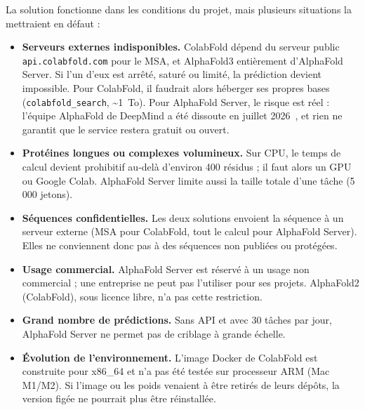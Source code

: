 La solution fonctionne dans les conditions du projet, mais plusieurs situations la mettraient en défaut :
\begin{itemize}
  \item \textbf{Serveurs externes indisponibles.} ColabFold dépend du serveur public \texttt{api.colabfold.com} pour le MSA, et AlphaFold3 entièrement d'AlphaFold Server. Si l'un d'eux est arrêté, saturé ou limité, la prédiction devient impossible. Pour ColabFold, il faudrait alors héberger ses propres bases (\texttt{colabfold\_search}, \textasciitilde 1~To). Pour AlphaFold Server, le risque est réel : l'équipe AlphaFold de DeepMind a été dissoute en juillet 2026~\cite{gigazine2026}, et rien ne garantit que le service restera gratuit ou ouvert.
  \item \textbf{Protéines longues ou complexes volumineux.} Sur CPU, le temps de calcul devient prohibitif au-delà d'environ 400 résidus ; il faut alors un GPU ou Google Colab. AlphaFold Server limite aussi la taille totale d'une tâche (5\,000 jetons).
  \item \textbf{Séquences confidentielles.} Les deux solutions envoient la séquence à un serveur externe (MSA pour ColabFold, tout le calcul pour AlphaFold Server). Elles ne conviennent donc pas à des séquences non publiées ou protégées.
  \item \textbf{Usage commercial.} AlphaFold Server est réservé à un usage non commercial ; une entreprise ne peut pas l'utiliser pour ses projets. AlphaFold2 (ColabFold), sous licence libre, n'a pas cette restriction.
  \item \textbf{Grand nombre de prédictions.} Sans API et avec 30 tâches par jour, AlphaFold Server ne permet pas de criblage à grande échelle.
  \item \textbf{Évolution de l'environnement.} L'image Docker de ColabFold est construite pour x86\_64 et n'a pas été testée sur processeur ARM (Mac M1/M2). Si l'image ou les poids venaient à être retirés de leurs dépôts, la version figée ne pourrait plus être réinstallée.
\end{itemize}

